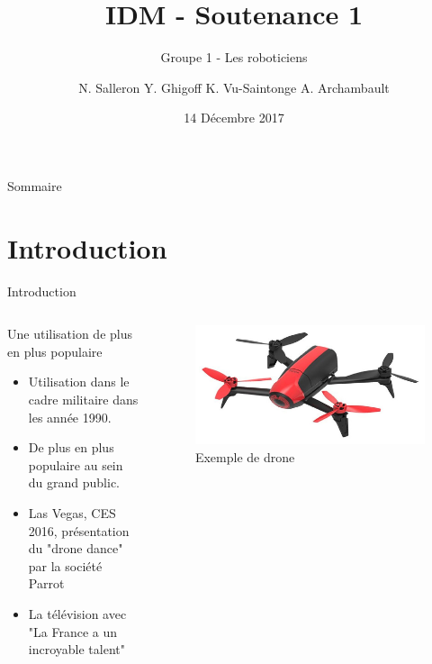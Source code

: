 \documentclass{bredelebeamer}
\title[Ingéniere dirigée par les Modéles]{IDM - Soutenance 1}
\subtitle{Groupe 1 - Les roboticiens}
\author{N. Salleron Y. Ghigoff K. Vu-Saintonge A. Archambault}
\date{14 Décembre 2017}
\begin{document}
\begin{frame}
  \titlepage
\end{frame}

\begin{frame}{Sommaire}
  \tableofcontents
\end{frame}

\section{Introduction}

\begin{frame}{Introduction}
\begin{columns}
\begin{column}{0.5\textwidth}
\begin{block}{Une utilisation de plus en plus populaire}
\begin{itemize}
\item Utilisation dans le cadre militaire dans les année 1990.
\item De plus en plus populaire au sein du grand public.
\item Las Vegas, CES 2016, présentation du "drone dance" par la société Parrot
\item La télévision avec "La France a un incroyable talent"
\end{itemize}
\end{block}
\end{column}
\begin{column}{0.5\textwidth}
\begin{figure}
\centering
\includegraphics[scale=0.15]{images/img1.jpg}
\caption{Exemple de drone}
\end{figure}
\end{column}
\end{columns}
\end{frame}
\end{document}

